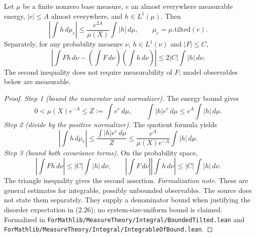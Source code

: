 \begin{lemma}\label{lem:sg-tal:perceptron-tilt-first-moment}
  \leanok
{}
Let $\mu$ be a finite nonzero base measure, $e$ an almost everywhere measurable energy,
$|e|\le A$ almost everywhere, and $h\in L^1(\mu)$. Then
\[
 \left|\int h\,d\mu_e\right|
 \le \frac{e^{2A}}{\mu(X)}\int |h|\,d\mu,
 \qquad \mu_e=\mu.\mathrm{tilted}(e).
\]
Separately, for any probability measure $\nu$, $h\in L^1(\nu)$ and $|F|\le C$,
\[
 \left|\int Fh\,d\nu-\left(\int F\,d\nu\right)\left(\int h\,d\nu\right)\right|
 \le 2|C|\int |h|\,d\nu.
\]
The second inequality does not require measurability of $F$; model observables below are measurable.
\end{lemma}
\begin{proof}
  \leanok
\emph{Step 1 (bound the numerator and normalizer).} The energy bound gives
\[
 0<\mu(X)e^{-A}\le Z:=\int e^e\,d\mu,
 \qquad \int |h|e^e\,d\mu\le e^A\int |h|\,d\mu.
\]
\emph{Step 2 (divide by the positive normalizer).} The quotient formula yields
\[
 \left|\int h\,d\mu_e\right|
 \le\frac{\int |h|e^e\,d\mu}{Z}
 \le\frac{e^A}{\mu(X)e^{-A}}\int |h|\,d\mu.
\]
\emph{Step 3 (bound both covariance terms).} On the probability space,
\[
 \left|\int Fh\,d\nu\right|\le |C|\int |h|\,d\nu,
 \qquad
 \left|\int F\,d\nu\right|\left|\int h\,d\nu\right|
 \le |C|\int |h|\,d\nu.
\]
The triangle inequality gives the second assertion.
\emph{Formalization note.} These are general estimates for integrable, possibly unbounded
observables. The source does not state them separately. They supply a denominator bound
when justifying the disorder expectation in (2.26); no system-size-uniform bound is claimed.
Formalized in \texttt{ForMathlib/MeasureTheory/Integral/BoundedTilted.lean} and
\texttt{ForMathlib/MeasureTheory/Integral/IntegrableOfBound.lean}.
\end{proof}


